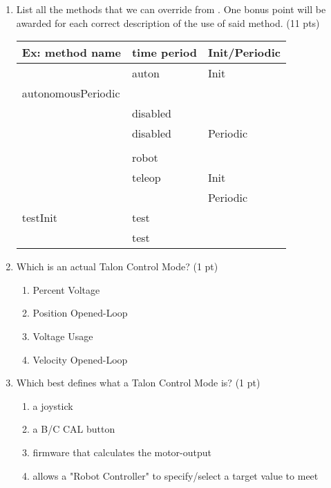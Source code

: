 \documentclass[11pt,fleqn]{article}
\begin{document}
\begin{enumerate}
\item List all the methods that we can override from . One bonus point will be awarded for each correct description of the use of said method. (11 pts) %
  \begin{center}
    \begin{tabu} to 0.9\textwidth { | X[l] | X[l] | X[l] | }
      \hline
      Ex: method name & time period & Init/Periodic \\ \hline\hline %
       & auton & Init \\ \hline %
      autonomousPeriodic &  &  \\ \hline %
      & disabled &  \\ \hline %
       & disabled & Periodic  \\ \hline %
      &  &  \\ \hline %
      & robot &  \\ \hline %
       & teleop & Init \\ \hline %
      & & Periodic \\ \hline %
      testInit & test &  \\ \hline %
      & test &  \\ \hline %
    \end{tabu}
  \end{center}

  \vspace{4ex}

\item Which is an actual Talon\textsuperscript\textregistered\xspace Control Mode? (1 pt)
	\begin{enumerate}
    	\item Percent Voltage
    	\item Position Opened-Loop
    	\item Voltage Usage
    	\item Velocity Opened-Loop
	\end{enumerate}

\item Which best defines what a Talon\textsuperscript\textregistered\xspace Control Mode is? (1 pt)
	\begin{enumerate}
	\item a joystick
	\item a B/C CAL button
	\item firmware that calculates the motor-output
	\item allows a "Robot Controller" to specify/select a target value to meet
	\end{enumerate}


\end{enumerate}
\end{document}
